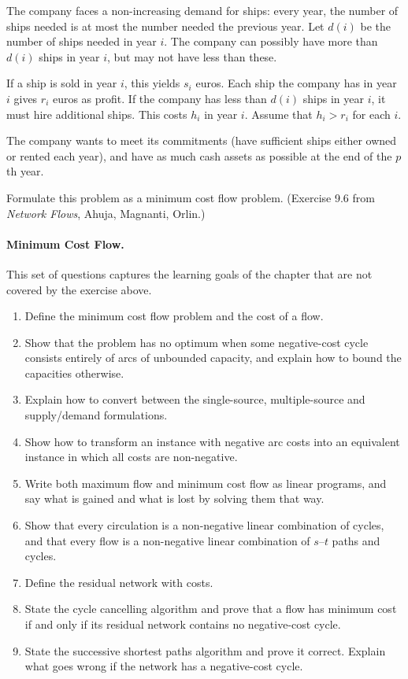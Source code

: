 The company faces a non-increasing demand for ships: every year, the number of
ships needed is at most the number needed the previous year. Let $d(i)$ be the
number of ships needed in year $i$. The company can possibly have more than
$d(i)$ ships in year $i$, but may not have less than these.

If a ship is sold in year $i$, this yields $s_i$ euros. Each ship the company has
in year $i$ gives $r_i$ euros as profit. If the company has less than $d(i)$
ships in year $i$, it must hire additional ships. This costs $h_i$ in year $i$.
Assume that $h_i > r_i$ for each $i$.

The company wants to meet its commitments (have sufficient ships either owned or
rented each year), and have as much cash assets as possible at the end of the
$p$th year.

Formulate this problem as a minimum cost flow problem.
(Exercise 9.6 from \emph{Network Flows}, Ahuja, Magnanti, Orlin.)

\paragraph{Minimum Cost Flow.}
This set of questions captures the learning goals of the chapter that are not
covered by the exercise above.
\begin{enumerate}
  \item Define the minimum cost flow problem and the cost of a flow.
  \item Show that the problem has no optimum when some negative-cost cycle
        consists entirely of arcs of unbounded capacity, and explain how to
        bound the capacities otherwise.
  \item Explain how to convert between the single-source, multiple-source and
        supply/demand formulations.
  \item Show how to transform an instance with negative arc costs into an
        equivalent instance in which all costs are non-negative.
  \item Write both maximum flow and minimum cost flow as linear programs, and
        say what is gained and what is lost by solving them that way.
  \item Show that every circulation is a non-negative linear combination of
        cycles, and that every flow is a non-negative linear combination of
        $s$--$t$ paths and cycles.
  \item Define the residual network with costs.
  \item State the cycle cancelling algorithm and prove that a flow has minimum
        cost if and only if its residual network contains no negative-cost
        cycle.
  \item State the successive shortest paths algorithm and prove it correct.
        Explain what goes wrong if the network has a negative-cost cycle.
\end{enumerate}

